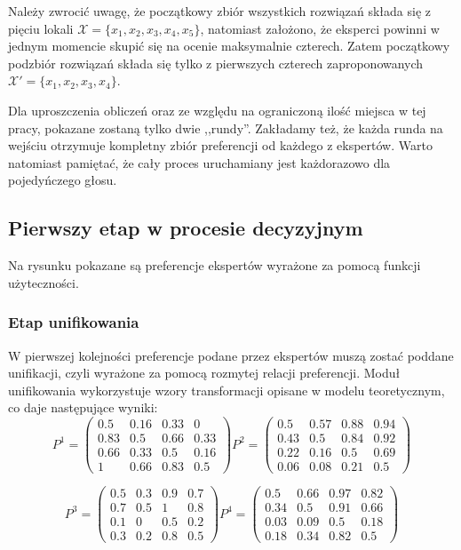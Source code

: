 Należy zwrocić uwagę, że początkowy zbiór wszystkich rozwiązań składa się z
pięciu lokali $\mathcal{X} = \{ x_1, x_2, x_3, x_4, x_5\}$, natomiast założono,
że eksperci powinni w jednym momencie skupić się na ocenie maksymalnie czterech.
Zatem początkowy podzbiór rozwiązań składa się tylko z pierwszych czterech
zaproponowanych $\mathcal{X'} = \{ x_1, x_2, x_3, x_4\}$.

Dla uproszczenia obliczeń oraz ze względu na ograniczoną ilość miejsca w tej
pracy, pokazane zostaną tylko dwie ,,rundy''. Zakładamy też, że każda runda na
wejściu otrzymuje kompletny zbiór preferencji od każdego z ekspertów. 
Warto natomiast pamiętać, że cały proces uruchamiany jest każdorazowo dla
pojedyńczego głosu. 

\subsection{Pierwszy etap w procesie decyzyjnym}
Na rysunku pokazane są preferencje ekspertów wyrażone za pomocą funkcji
użyteczności.

\subsubsection{Etap unifikowania}
W pierwszej kolejności preferencje podane przez ekspertów muszą zostać poddane
unifikacji, czyli wyrażone za pomocą rozmytej relacji preferencji. Moduł
unifikowania wykorzystuje wzory transformacji opisane w modelu teoretycznym, co
daje następujące wyniki:
$$
P^1 = 
\begin{pmatrix}
0.5  & 0.16  & 0.33  & 0    \\
0.83 & 0.5   & 0.66  & 0.33 \\
0.66 & 0.33  & 0.5   & 0.16 \\
1    & 0.66  & 0.83  & 0.5
\end{pmatrix}
P^2 = 
\begin{pmatrix}
0.5  & 0.57  & 0.88  & 0.94 \\
0.43 & 0.5   & 0.84  & 0.92 \\
0.22 & 0.16  & 0.5   & 0.69 \\
0.06 & 0.08  & 0.21  & 0.5
\end{pmatrix}
$$

$$
P^3 = 
\begin{pmatrix}
0.5  & 0.3   & 0.9   & 0.7  \\
0.7  & 0.5   & 1     & 0.8  \\
0.1  & 0     & 0.5   & 0.2  \\
0.3  & 0.2   & 0.8   & 0.5
\end{pmatrix}
P^4 = 
\begin{pmatrix}
0.5  & 0.66  & 0.97  & 0.82 \\
0.34 & 0.5   & 0.91  & 0.66 \\
0.03 & 0.09  & 0.5   & 0.18 \\
0.18 & 0.34  & 0.82  & 0.5
\end{pmatrix}
$$
  
